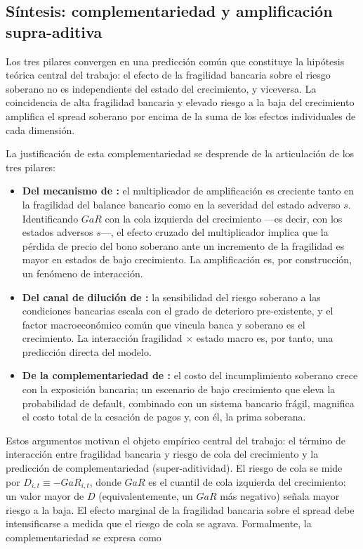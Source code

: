 \subsection{Síntesis: complementariedad y amplificación supra-aditiva}
\label{sec:sintesis-pilares}

Los tres pilares convergen en una predicción común que constituye la hipótesis teórica central del trabajo: el efecto de la fragilidad bancaria sobre el riesgo soberano no es independiente del estado del crecimiento, y viceversa. La coincidencia de alta fragilidad bancaria y elevado riesgo a la baja del crecimiento amplifica el spread soberano por encima de la suma de los efectos individuales de cada dimensión.

La justificación de esta complementariedad se desprende de la articulación de los tres pilares:

\begin{itemize}
    \item \textbf{Del mecanismo de \citet{FarhiTirole2018b}:} el multiplicador de amplificación es creciente tanto en la fragilidad del balance bancario como en la severidad del estado adverso $s$. Identificando $GaR$ con la cola izquierda del crecimiento —es decir, con los estados adversos $s$—, el efecto cruzado del multiplicador implica que la pérdida de precio del bono soberano ante un incremento de la fragilidad es mayor en estados de bajo crecimiento. La amplificación es, por construcción, un fenómeno de interacción.
    \item \textbf{Del canal de dilución de \citet{AcharyaDrechslerSchnabl2014b}:} la sensibilidad del riesgo soberano a las condiciones bancarias escala con el grado de deterioro pre-existente, y el factor macroeconómico común que vincula banca y soberano es el crecimiento. La interacción fragilidad $\times$ estado macro es, por tanto, una predicción directa del modelo.
    \item \textbf{De la complementariedad de \citet{GennaioliMartinRossi2014}:} el costo del incumplimiento soberano crece con la exposición bancaria; un escenario de bajo crecimiento que eleva la probabilidad de default, combinado con un sistema bancario frágil, magnifica el costo total de la cesación de pagos y, con él, la prima soberana.
\end{itemize}

Estos argumentos motivan el objeto empírico central del trabajo: el término de interacción entre fragilidad bancaria y riesgo de cola del crecimiento y la predicción de complementariedad (super-aditividad). El riesgo de cola se mide por $D_{i,t}\equiv-GaR_{i,t}$, donde $GaR$ es el cuantil de cola izquierda del crecimiento: un valor mayor de $D$ (equivalentemente, un $GaR$ más negativo) señala mayor riesgo a la baja. El efecto marginal de la fragilidad bancaria sobre el spread debe intensificarse a medida que el riesgo de cola se agrava. Formalmente, la complementariedad se expresa como

